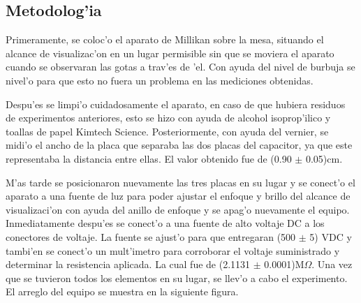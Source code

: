 \documentclass{article}
\begin{document}
\begin{multicols}{2}
\section*{Metodolog'ia}\label{Metodologia}				%

Primeramente, se coloc'o el aparato de Millikan sobre la mesa, situando el alcance de visualizac'on en un lugar permisible sin que se moviera el aparato cuando se observaran las gotas a trav'es de 'el. Con ayuda del nivel de burbuja se nivel'o para que esto no fuera un problema en las mediciones obtenidas.

Despu'es se limpi'o cuidadosamente el aparato, en caso de que hubiera residuos de experimentos anteriores, esto se hizo con ayuda de alcohol isoprop'ilico y toallas de papel Kimtech Science. Posteriormente, con ayuda del vernier, se midi'o el ancho de la placa que separaba las dos placas del capacitor, ya que este representaba la distancia entre ellas. El valor obtenido fue de (0.90 $\pm$ 0.05)cm.

M'as tarde se posicionaron nuevamente las tres placas en su lugar y se conect'o el aparato a una fuente de luz para poder ajustar el enfoque y brillo del alcance de visualizaci'on con ayuda del anillo de enfoque y se apag'o nuevamente el equipo. Inmediatamente despu'es se conect'o a una fuente de alto voltaje DC a los conectores de voltaje. La fuente se ajust'o para que entregaran (500 $\pm$ 5) VDC y tambi'en se conect'o un mult'imetro para corroborar el voltaje suministrado y determinar la resistencia aplicada. La cual fue de (2.1131 $\pm$ 0.0001)\;M$\Omega$. Una vez que se tuvieron todos los elementos en su lugar, se llev'o a cabo el experimento. El arreglo del equipo se muestra en la siguiente figura.


\end{multicols}
\end{document}
